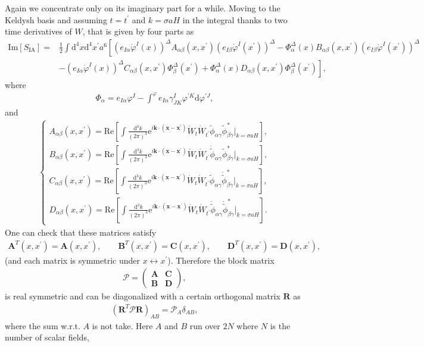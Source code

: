 \documentclass[aps, prd
, preprint
, nofootinbib 
]{revtex4-1}
\newcommand{\dd}{\mathrm{d}}
\newcommand{\ee}{\mathrm{e}}
\newcommand{\calP}{\mathcal{P}}
\renewcommand{\Re}{\mathrm{Re}}
\renewcommand{\Im}{\mathrm{Im}}
\newcommand{\dk}{\frac{\dd^3k}{(2\pi)^3}}
\newcommand{\bae}[1]{\begin{align} #1 \end{align}}
\newcommand{\bce}[1]{\begin{cases} #1 \end{cases}}
\newcommand{\bpme}[1]{\begin{pmatrix} #1 \end{pmatrix}}
\begin{document}
Again we concentrate only on its imaginary part for a while. Moving to the Keldysh basis and assuming $t=t^\prime$ and
$k=\sigma aH$ in the integral thanks to two time derivatives of $W$, that is given by four parts as
\bae{
	\Im[S_\text{IA}]=&\frac{1}{2}\int\dd^4x\dd^4x^\prime a^6\left[
	\left(e_{I\alpha}\dot{\varphi}^I(x)\right)^\Delta A_{\alpha\beta}(x,x^\prime)\left(e_{I\beta}\dot{\varphi}^I(x^\prime)\right)^\Delta
	-\Phi^\Delta_\alpha(x)B_{\alpha\beta}(x,x^\prime)
	\left(e_{I\beta}\dot{\varphi}^I(x^\prime)\right)^\Delta\right. \nonumber \\
	&\left.-\left(e_{I\alpha}\dot{\varphi}^I(x)\right)^\Delta C_{\alpha\beta}(x,x^\prime)
	\Phi^\Delta_\beta(x^\prime) 
	+\Phi^\Delta_\alpha(x)D_{\alpha\beta}(x,x^\prime)\Phi^\Delta_\beta(x^\prime)\right],
}
where 
\bae{
	\Phi_\alpha=e_{I\alpha}\varphi^I-\int^\varphi e_{I\alpha}\gamma^I_{JK}\varphi^{\prime K}\dd\varphi^{\prime J},
}
and
\bae{
	\bce{
		\displaystyle
		A_{\alpha\beta}(x,x^\prime)=\Re\left[\int\dk\ee^{i\mathbf{k}\cdot(\mathbf{x}-\mathbf{x}^\prime)}\dot{W}_t\dot{W}_{t^\prime}
		\tilde{\phi}_{\alpha\gamma}\tilde{\phi}_{\beta\gamma}^*|_{k=\sigma aH}\right], \\[10pt]
		\displaystyle
		B_{\alpha\beta}(x,x^\prime)=\Re\left[\int\dk\ee^{i\mathbf{k}\cdot(\mathbf{x}-\mathbf{x}^\prime)}\dot{W}_t\dot{W}_{t^\prime}
		\dot{\tilde{\phi}}_{\alpha\gamma}\tilde{\phi}_{\beta\gamma}^*|_{k=\sigma aH}\right], \\[10pt]
		\displaystyle
		C_{\alpha\beta}(x,x^\prime)=\Re\left[\int\dk\ee^{i\mathbf{k}\cdot(\mathbf{x}-\mathbf{x}^\prime)}\dot{W}_t\dot{W}_{t^\prime}
		\tilde{\phi}_{\alpha\gamma}\dot{\tilde{\phi}}_{\beta\gamma}^*|_{k=\sigma aH}\right], \\[10pt]
		\displaystyle
		D_{\alpha\beta}(x,x^\prime)=\Re\left[\int\dk\ee^{i\mathbf{k}\cdot(\mathbf{x}-\mathbf{x}^\prime)}\dot{W}_t\dot{W}_{t^\prime}
		\dot{\tilde{\phi}}_{\alpha\gamma}\dot{\tilde{\phi}}_{\beta\gamma}^*|_{k=\sigma aH}\right].
	}
}
One can check that these matrices satisfy
\bae{
	\bm{A}^T(x,x^\prime)=\bm{A}(x,x^\prime), \quad\quad \bm{B}^T(x,x^\prime)=\bm{C}(x,x^\prime), \quad\quad 
	\bm{D}^T(x,x^\prime)=\bm{D}(x,x^\prime),
}
(and each matrix is symmetric under $x\leftrightarrow x^\prime$). Therefore the block matrix
\bae{
	\bm{\calP}=
	\bpme{
		\bm{A} & \bm{C} \\
		\bm{B} & \bm{D}
	},
}
is real symmetric and can be diagonalized with a certain orthogonal matrix $\bm{R}$ as
\bae{
	(\bm{R}^T\bm{\calP}\bm{R})_{AB}=\calP_A\delta_{AB},
}
where the sum w.r.t. $A$ is not take. Here $A$ and $B$ run over $2N$ where $N$ is the number of scalar fields,
\end{document}
